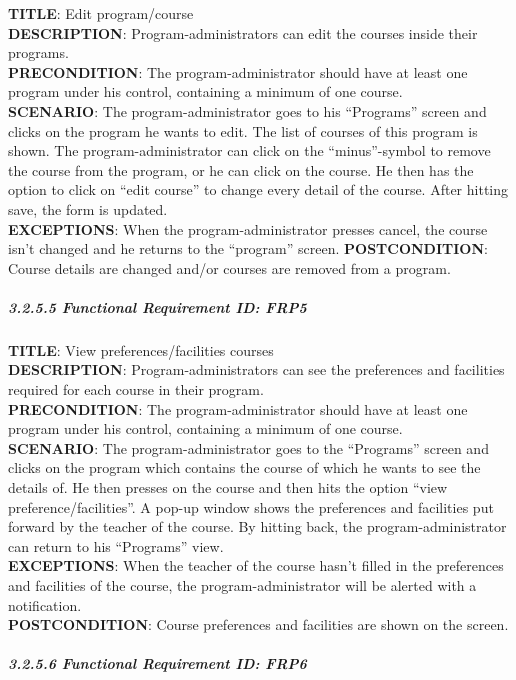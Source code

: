 \documentclass[12pt]{article}
\begin{document}
\textbf{TITLE}: Edit program/course\\\textbf{DESCRIPTION}:
Program-administrators can edit the courses inside their
programs.\\\textbf{PRECONDITION}: The program-administrator should have
at least one program under his control, containing a minimum of one
course.\\\textbf{SCENARIO}: The program-administrator goes to his
``Programs'' screen and clicks on the program he wants to edit. The list
of courses of this program is shown. The program-administrator can click
on the ``minus''-symbol to remove the course from the program, or he can
click on the course. He then has the option to click on ``edit course''
to change every detail of the course. After hitting save, the form is
updated.\\\textbf{EXCEPTIONS}: When the program-administrator presses
cancel, the course isn't changed and he returns to the ``program''
screen. \textbf{POSTCONDITION}: Course details are changed and/or
courses are removed from a program.

\subparagraph{3.2.5.5 Functional Requirement \textbf{ID}:
FRP5\\}\label{functional-requirement-id-frp5}

\textbf{TITLE}: View preferences/facilities
courses\\\textbf{DESCRIPTION}: Program-administrators can see the
preferences and facilities required for each course in their
program.\\\textbf{PRECONDITION}: The program-administrator should have
at least one program under his control, containing a minimum of one
course.\\\textbf{SCENARIO}: The program-administrator goes to the
``Programs'' screen and clicks on the program which contains the course
of which he wants to see the details of. He then presses on the course
and then hits the option ``view preference/facilities''. A pop-up window
shows the preferences and facilities put forward by the teacher of the
course. By hitting back, the program-administrator can return to his
``Programs'' view.\\\textbf{EXCEPTIONS}: When the teacher of the course
hasn't filled in the preferences and facilities of the course, the
program-administrator will be alerted with a
notification.\\\textbf{POSTCONDITION}: Course preferences and facilities
are shown on the screen.

\subparagraph{3.2.5.6 Functional Requirement \textbf{ID}:
FRP6\\}\label{functional-requirement-id-frp6}
\end{document}

